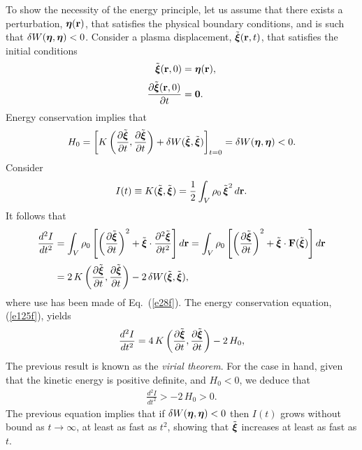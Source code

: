\documentclass[12pt,prb,aps,notitlepage]{revtex4-1}
\newcommand{\bxi}{\mbox{\boldmath$\xi$}}
\newcommand{\bta}{\mbox{\boldmath$\eta$}}
\begin{document}
To show the necessity of the energy principle, let us assume that there exists a perturbation, $\bta({\bf r})$, that satisfies the physical boundary conditions,
 and is such that
$\delta W(\bta,\bta)<0$. Consider a plasma displacement, $\tilde{\bxi}({\bf r},t)$, that satisfies the initial conditions
\begin{align}
\tilde{\bxi}({\bf r},0)&= \bta({\bf r}),\\[0.5ex]
\frac{\partial\tilde{\bxi}({\bf r},0)}{\partial t}&= {\bf 0}.
\end{align}
Energy conservation implies that
\begin{equation}
H_0 = \left[K\left(\frac{\partial\tilde{\bxi}}{\partial t},\frac{\partial\tilde{\bxi}}{\partial t}\right) + \delta W(\tilde{\bxi},\tilde{\bxi})\right]_{t=0}= \delta W(\bta,\bta) < 0.
\end{equation}
Consider 
\begin{equation}
I(t) \equiv K(\tilde{\bxi},\tilde{\bxi})=\frac{1}{2}\int_V \rho_0\,\tilde{\bxi}^2\,d{\bf r}.
\end{equation}
It follows that
\begin{align}\label{e131f}
\frac{d^2 I}{dt^2} &= \int_V \rho_0\left[\left(\frac{\partial\tilde{\bxi}}{\partial t}\right)^2+ \tilde{\bxi}\cdot\frac{\partial^2\tilde{\bxi}}{\partial t^2}\right]d{\bf r}
=  \int_V \rho_0\left[\left(\frac{\partial\tilde{\bxi}}{\partial t}\right)^2+ \tilde{\bxi}\cdot{\bf F}(\tilde{\bxi})\right]d{\bf r}\nonumber\\[0.5ex]
&= 2\,K\left(\frac{\partial\tilde{\bxi}}{\partial t},\frac{\partial\tilde{\bxi}}{\partial t}\right) - 2\,\delta W(\tilde{\bxi},\tilde{\bxi}) ,
\end{align}
where use has been made of Eq.~(\ref{e28f}). 
The energy conservation equation, (\ref{e125f}), yields
\begin{align}\label{e153}
\frac{d^2 I}{dt^2}= 4\,K\left(\frac{\partial\tilde{\bxi}}{\partial t}, 
\frac{\partial\tilde{\bxi}}{\partial t}\right) -2\,H_0,
\end{align}
The previous result is known as the {\em virial theorem}. For the case in hand, given that the kinetic energy is positive definite, and $H_0<0$, we deduce that
\begin{align}
\frac{d^2 I}{dt^2} >-2\,H_0>0.
\end{align}
The previous equation implies that if $\delta W(\bta,\bta)<0$ then $I(t)$ grows without
bound as $t\rightarrow \infty$, at least as fast as $t^2$,  showing that $\tilde{\bxi}$ increases at least as fast as $t$. 
\end{document}
